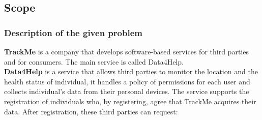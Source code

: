 \documentclass[a4paper]{article}
\begin{document}
\subsection{Scope}
\subsubsection{Description of the given problem}

\textbf{TrackMe} is a company that develops software-based services for third parties and for consumers. The main service is called Data4Help. \\
\textbf{Data4Help} is a service that allows third parties to monitor the location and the health status of individual, it handles a policy of permissions for each user and collects individual’s data from their personal devices.
The service supports the registration of individuals who, by registering, agree that TrackMe acquires their data. After registration, these third parties can request:
\end{document}
